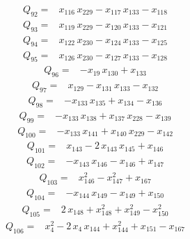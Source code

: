\documentclass[11pt]{article}
\theoremstyle{definition}\newtheorem{definition}[theorem]{Definition}
\begin{document}
\begin{align*}
Q_{92}={}&x_{116}\,x_{229}-x_{117}\,x_{133}-x_{118}
\end{align*}
\begin{align*}
Q_{93}={}&x_{119}\,x_{229}-x_{120}\,x_{133}-x_{121}
\end{align*}
\begin{align*}
Q_{94}={}&x_{122}\,x_{230}-x_{124}\,x_{133}-x_{125}
\end{align*}
\begin{align*}
Q_{95}={}&x_{126}\,x_{230}-x_{127}\,x_{133}-x_{128}
\end{align*}
\begin{align*}
Q_{96}={}&-x_{19}\,x_{130}+x_{133}
\end{align*}
\begin{align*}
Q_{97}={}&x_{129}-x_{131}\,x_{133}-x_{132}
\end{align*}
\begin{align*}
Q_{98}={}&-x_{133}\,x_{135}+x_{134}-x_{136}
\end{align*}
\begin{align*}
Q_{99}={}&-x_{133}\,x_{138}+x_{137}\,x_{228}-x_{139}
\end{align*}
\begin{align*}
Q_{100}={}&-x_{133}\,x_{141}+x_{140}\,x_{229}-x_{142}
\end{align*}
\begin{align*}
Q_{101}={}&x_{143}-2\,x_{143}\,x_{145}+x_{146}
\end{align*}
\begin{align*}
Q_{102}={}&-x_{143}\,x_{146}-x_{146}+x_{147}
\end{align*}
\begin{align*}
Q_{103}={}&x_{146}^{2}-x_{147}^{2}+x_{167}
\end{align*}
\begin{align*}
Q_{104}={}&-x_{144}\,x_{149}-x_{149}+x_{150}
\end{align*}
\begin{align*}
Q_{105}={}&2\,x_{148}+x_{148}^{2}+x_{149}^{2}-x_{150}^{2}
\end{align*}
\begin{align*}
Q_{106}={}&x_{4}^{2}-2\,x_{4}\,x_{144}+x_{144}^{2}+x_{151}-x_{167}
\end{align*}
\end{document}
